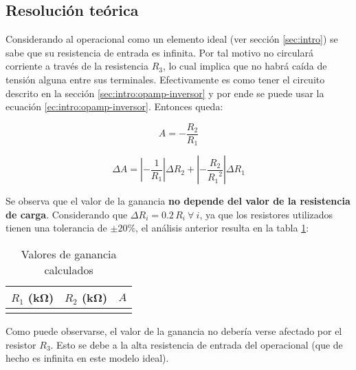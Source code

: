 \subsection{Resolución teórica}

Considerando al operacional como un elemento ideal (ver sección \ref{sec:intro}) se sabe que su resistencia de entrada es infinita. Por tal motivo no circulará corriente a través de la resistencia $R_3$, lo cual implica que no habrá caída de tensión alguna entre sus terminales. Efectivamente es como tener el circuito descrito en la sección \ref{sec:intro:opamp-inversor} y por ende se puede usar la ecuación \ref{ec:intro:opamp-inversor}. Entonces queda:

\begin{equation}
    \label{ec:1-teoria:ganancia}
    A = -\frac{R_2}{R_1}
\end{equation}

\begin{equation}
    \label{ec:1-teoria:err-ganancia}
    \Delta A = \left| - \frac{1}{R_1} \right| \Delta R_2
             + \left| - \frac{R_2}{{R_1}^2} \right| \Delta R_1
\end{equation}

Se observa que el valor de la ganancia \textbf{no depende del valor de la resistencia de carga}. Considerando que $\Delta R_i = 0.2\,R_i\ \forall\ i$, ya que los resistores utilizados tienen una tolerancia de $\pm 20\%$, el análisis anterior resulta en la tabla \ref{tab:1-teoria:valores}:

\begin{table}[H]
    \centering
    \begin{tabular}{@{}rrr@{}}
        \toprule
        $R_1$ (\si{\kilo\ohm}) & $R_2$ (\si{\kilo\ohm}) & $A$ \\
        \midrule
         \\ \bottomrule
    \end{tabular}
    \caption{Valores de ganancia calculados}
    \label{tab:1-teoria:valores}
\end{table}

Como puede observarse, el valor de la ganancia no debería verse afectado por el resistor $R_3$. Esto se debe a la alta resistencia de entrada del operacional (que de hecho es infinita en este modelo ideal).

